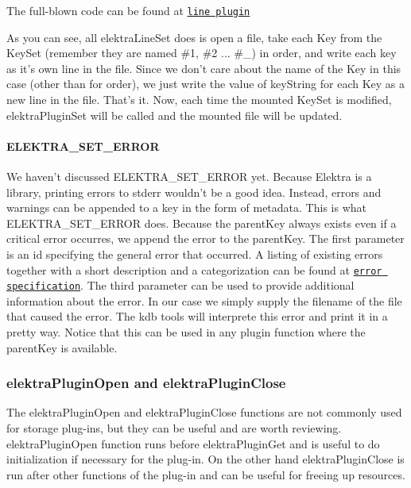 The full-\/blown code can be found at \href{http://libelektra.org/tree/master/src/plugins/line/line.c}{\tt line plugin}

As you can see, all {\ttfamily elektra\+Line\+Set} does is open a file, take each Key from the Key\+Set (remember they are named {\ttfamily \#1}, {\ttfamily \#2} ... {\ttfamily \#\+\_}) in order, and write each key as it's own line in the file. Since we don't care about the name of the Key in this case (other than for order), we just write the value of {\ttfamily key\+String} for each Key as a new line in the file. That's it. Now, each time the mounted Key\+Set is modified, {\ttfamily elektra\+Plugin\+Set} will be called and the mounted file will be updated.

\paragraph*{E\+L\+E\+K\+T\+R\+A\+\_\+\+S\+E\+T\+\_\+\+E\+R\+R\+O\+R}

We haven't discussed {\ttfamily E\+L\+E\+K\+T\+R\+A\+\_\+\+S\+E\+T\+\_\+\+E\+R\+R\+O\+R} yet. Because Elektra is a library, printing errors to stderr wouldn't be a good idea. Instead, errors and warnings can be appended to a key in the form of metadata. This is what {\ttfamily E\+L\+E\+K\+T\+R\+A\+\_\+\+S\+E\+T\+\_\+\+E\+R\+R\+O\+R} does. Because the parent\+Key always exists even if a critical error occurres, we append the error to the {\ttfamily parent\+Key}. The first parameter is an id specifying the general error that occurred. A listing of existing errors together with a short description and a categorization can be found at \href{https://github.com/ElektraInitiative/libelektra/blob/master/src/liberror/specification}{\tt error specification}. The third parameter can be used to provide additional information about the error. In our case we simply supply the filename of the file that caused the error. The kdb tools will interprete this error and print it in a pretty way. Notice that this can be used in any plugin function where the parent\+Key is available.

\subsubsection*{elektra\+Plugin\+Open and elektra\+Plugin\+Close}

The {\ttfamily elektra\+Plugin\+Open} and {\ttfamily elektra\+Plugin\+Close} functions are not commonly used for storage plug-\/ins, but they can be useful and are worth reviewing. {\ttfamily elektra\+Plugin\+Open} function runs before {\ttfamily elektra\+Plugin\+Get} and is useful to do initialization if necessary for the plug-\/in. On the other hand {\ttfamily elektra\+Plugin\+Close} is run after other functions of the plug-\/in and can be useful for freeing up resources.

